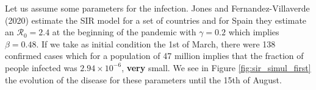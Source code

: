 \documentclass[a4paper,11pt]{article}
\theoremstyle{definition}
\theoremstyle{plain}
\begin{document}
Let us assume some parameters for the infection. Jones and
Fernandez-Villaverde (2020) estimate the SIR model for a set of
countries and for Spain they estimate an \(\mathcal{R}_0 = 2.4\) at the
beginning of the pandemic with \(\gamma = 0.2\) which implies
\(\beta = 0.48\). If we take as initial condition the 1st of March,
there were 138 confirmed cases which for a population of 47 million
implies that the fraction of people infected was \(2.94\times 10^{-6}\),
\textbf{very} small. We see in Figure \ref{fig:sir_simul_first} the evolution of the disease for these parameters until the 15th of August.

\begin{figure}[htbp]
\sbox{}
\end{figure}
\end{document}
